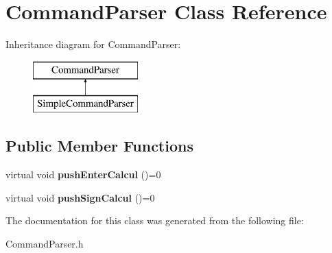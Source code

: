 \hypertarget{class_command_parser}{}\section{Command\+Parser Class Reference}
\label{class_command_parser}
Inheritance diagram for Command\+Parser\+:\begin{figure}[H]
\begin{center}
\leavevmode
\includegraphics[height=2.000000cm]{class_command_parser}
\end{center}
\end{figure}
\subsection*{Public Member Functions}
\begin{DoxyCompactItemize}
\item 
\hypertarget{class_command_parser_a83641f98a2d06b36676af86e30974a3a}{}virtual void {\bfseries push\+Enter\+Calcul} ()=0\label{class_command_parser_a83641f98a2d06b36676af86e30974a3a}

\item 
\hypertarget{class_command_parser_a1c31dbab30dc098e1f722182030e5beb}{}virtual void {\bfseries push\+Sign\+Calcul} ()=0\label{class_command_parser_a1c31dbab30dc098e1f722182030e5beb}

\end{DoxyCompactItemize}


The documentation for this class was generated from the following file\+:\begin{DoxyCompactItemize}
\item 
Command\+Parser.\+h\end{DoxyCompactItemize}

